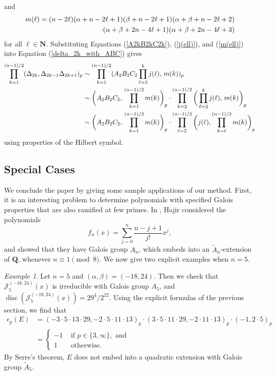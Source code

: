 \documentclass{amsart}
\newcommand{\Q}{\mathbf{Q}}
\newcommand{\disc}{\operatorname{disc}}
\theoremstyle{plain}
\theoremstyle{remark}
\newtheorem{exm}[equation]{Example}
\begin{document}
and
\begin{align} \label{m(ell)}
    m(\ell)=(n-2\ell)(\alpha+n-2\ell+1)(\beta+n-2\ell+1)(\alpha+\beta+n-2\ell+2)
    \\\cdot(\alpha+\beta+2n-4\ell+1)(\alpha+\beta+2n-4\ell+3) \notag
\end{align}
for all $\ell\in \mathbf{N}$. Substituting Equations (\ref{A2kB2kC2k}), (\ref{j(ell)}), and (\ref{m(ell)}) into Equation (\ref{delta_2k_with_ABC}) gives
\begin{align}
\prod_{k=1}^{(n-1)/2} (\Delta_{2k},\Delta_{2k-1}\Delta_{2k+1})_p&\sim \prod_{k=1}^{(n-1)/2}(A_2B_2C_2\prod_{\ell=2}^kj(\ell),\,m(k))_p \notag\\
&\sim \bigg(A_2B_2C_2,\,\prod_{k=1}^{(n-1)/2}m(k)\bigg)_p \cdot\prod_{k=2}^{(n-1)/2}\bigg(\prod_{\ell=2}^kj(\ell),\,m(k)\bigg)_p \notag\\
&\sim \bigg(A_2B_2C_2,\,\prod_{k=1}^{(n-1)/2}m(k)\bigg)_p\cdot\prod_{\ell=2}^{(n-1)/2}\bigg(j(\ell),\prod_{k=\ell}^{(n-1)/2}m(k)\bigg)_p \label{delta_2k_rearranged}
\end{align}
using properties of the Hilbert symbol. 

\subsection{Special Cases} \label{special_cases_section} We conclude the paper by giving some sample applications of our method.  First, it is an interesting problem to determine polynomials with specified Galois properties that are also ramified at few primes.  In \cite{hajir}, Hajir considered the polynomials
\[
f_n(x) = \sum_{j=0}^n \frac{n-j+1}{j!}x^j,
\]
and showed that they have Galois group $A_n$, which embeds into an $\widetilde{A}_{n}$-extension of $\Q$, whenever $n \equiv 1 \pmod{8}$.  We now give two explicit examples when $n=5$.  

\begin{exm}
Let $n=5$ and $(\alpha,\beta) = (-18,24)$.  Then we check that $\mathscr{J}_5^{(-18,24)}(x)$ is irreducible with Galois group $A_5$, and $\disc(\mathscr{J}_5^{(-18,24)}(x)) = 29^4/2^{22}$.  Using the explicit formulas of the previous section, we find that
\begin{align*}
\epsilon_p(E) &= (-3\cdot5\cdot13\cdot29,-2\cdot5\cdot11\cdot13)_p \cdot (3\cdot5\cdot11\cdot29,-2\cdot11\cdot13)_p \cdot (-1,2\cdot 5)_p \\
&=\begin{cases} -1 & \text{ if } p \in \lbrace 3,\infty \rbrace, \text{ and} \\
1 & \text{ otherwise.}
\end{cases}
\end{align*}
By Serre's theorem, $E$ does not embed into a quadratic extension with Galois group $\widetilde{A}_5$.
\end{exm}
\end{document}
